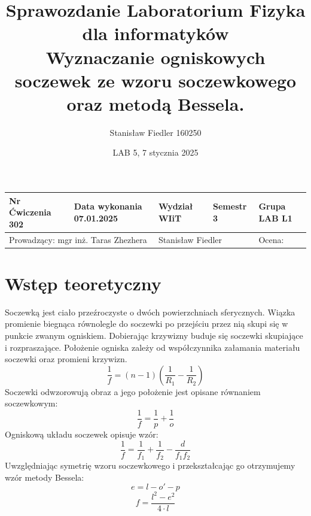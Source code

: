 \documentclass[a4paper, 11pt]{article}
\title{%
        \vspace{-1cm}
       \large Sprawozdanie Laboratorium Fizyka dla informatyków \\
       \huge Wyznaczanie ogniskowych soczewek
ze wzoru soczewkowego oraz metodą Bessela.}
\author{Stanisław Fiedler 160250}
\date{LAB 5, 7 stycznia 2025}
\begin{document}
\begin{table}
	\begin{adjustwidth}{-0.25\textwidth}{-0.25\textwidth}
		\begin{center}
			\begin{tabular}{|l|l|l|l|l|}
				\hline
				Nr Ćwiczenia 302                                             & Data wykonania 07.01.2025                 & Wydział WIiT & Semestr 3 & Grupa LAB L1 \\
				\hline
				\multicolumn{2}{|l|}{ Prowadzący: mgr inż. Taras Zhezhera  } & \multicolumn{2}{|l|}{ Stanisław Fiedler } & Ocena:                                  \\
				\hline
			\end{tabular}
		\end{center}
	\end{adjustwidth}
\end{table}

\maketitle
\tableofcontents

\section{Wstęp teoretyczny}\label{sec:wstep} %

Soczewką jest ciało przeźroczyste o dwóch powierzchniach sferycznych.
Wiązka promienie biegnąca równolegle do soczewki po przejściu przez nią skupi się w punkcie zwanym ogniskiem.
Dobierając krzywizny buduje się soczewki skupiające i rozpraszające.
Położenie ogniska zależy od współczynnika załamania materiału soczewki oraz promieni krzywizn.
\[
	\frac{1}{f} = (n-1) \left( \frac{1}{R_1} - \frac{1}{R_2} \right)
\]
Soczewki odwzorowują obraz a jego położenie jest opisane równaniem soczewkowym:
\[
	\frac{1}{f} = \frac{1}{p} + \frac{1}{o}
\]
Ogniskową układu soczewek opisuje wzór:
\[
	\frac{1}{f} = \frac{1}{f_1} + \frac{1}{f_2} - \frac{d}{f_1f_2}
\]
Uwzględniając symetrię wzoru soczewkowego i przekształcając go otrzymujemy wzór metody Bessela:
\[
	e = l - o' - p
\]
\[
	f = \frac{l^2 - e^2}{4 \cdot l}
\]

\end{document}
